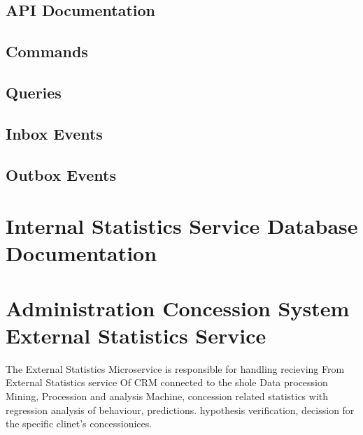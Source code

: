 \documentclass[letterpaper,10pt,english]{sphinxmanual}
\begin{document}
\subsection{API Documentation}
\label{\detokenize{administration_concession_system/internal_satistics_service:api-documentation}}

\subsection{Commands}
\label{\detokenize{administration_concession_system/internal_satistics_service:commands}}

\subsection{Queries}
\label{\detokenize{administration_concession_system/internal_satistics_service:queries}}

\subsection{Inbox Events}
\label{\detokenize{administration_concession_system/internal_satistics_service:inbox-events}}

\subsection{Outbox Events}
\label{\detokenize{administration_concession_system/internal_satistics_service:outbox-events}}

\section{Internal Statistics Service Database Documentation}
\label{\detokenize{administration_concession_system/internal_satistics_service:internal-statistics-service-database-documentation}}
\sphinxstepscope


\section{Administration Concession System External Statistics Service}
\label{\detokenize{administration_concession_system/external_statistics_service:administration-concession-system-external-statistics-service}}\label{\detokenize{administration_concession_system/external_statistics_service::doc}}
\sphinxAtStartPar
The External  Statistics Microservice is responsible for handling recieving From External Statistics service Of CRM connected to the shole Data procession Mining, Procession and analysis Machine, concession related statistics with regression analysis of behaviour, predictions. hypothesis verification, decission for the specific clinet’s concessionices.
\end{document}
